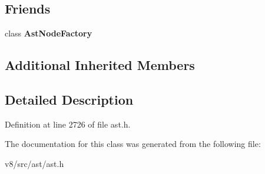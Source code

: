 \subsection*{Friends}
\begin{DoxyCompactItemize}
\item 
\mbox{\label{classv8_1_1internal_1_1SuperCallReference_a8d587c8ad3515ff6433eb83c578e795f}} 
class {\bfseries Ast\+Node\+Factory}
\end{DoxyCompactItemize}
\subsection*{Additional Inherited Members}


\subsection{Detailed Description}


Definition at line 2726 of file ast.\+h.



The documentation for this class was generated from the following file\+:\begin{DoxyCompactItemize}
\item 
v8/src/ast/ast.\+h\end{DoxyCompactItemize}
